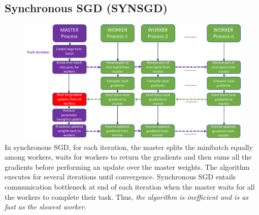 \documentclass[12pt]{article}
\begin{document}
\subsection{Synchronous SGD (SYNSGD)}
{\centering\includegraphics[width=14cm, height=6cm]{images/syncsgd_cstruct.pdf}} \\
In synchronous SGD, for each iteration, the master splits the minibatch equally among workers, waits for workers to return the gradients and then sums all the gradients before performing an update over the master weights. The algorithm executes for several iterations until convergence. %
Synchronous SGD entails communication bottleneck at end of each iteration when the master waits for all the workers to complete their task. Thus, \textit{the algorithm is inefficient and is as fast as the slowest worker}.
\end{document}

